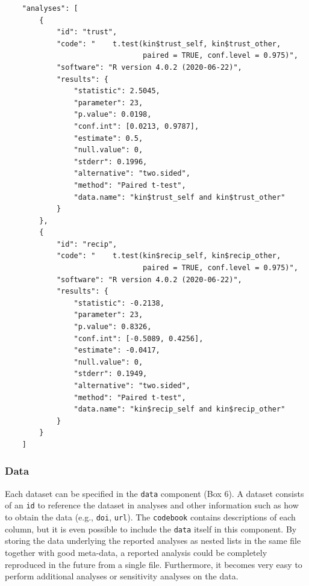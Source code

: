 \documentclass[
  english,
  doc,floatsintext]{apa6}
\begin{document}
\begin{tcolorbox}[colback=black!5!white,colframe=white!5!black,title=Box 5. The analysis component.]
\begin{verbatim}
    "analyses": [
        {
            "id": "trust",
            "code": "    t.test(kin$trust_self, kin$trust_other, 
                                paired = TRUE, conf.level = 0.975)",
            "software": "R version 4.0.2 (2020-06-22)",
            "results": {
                "statistic": 2.5045,
                "parameter": 23,
                "p.value": 0.0198,
                "conf.int": [0.0213, 0.9787],
                "estimate": 0.5,
                "null.value": 0,
                "stderr": 0.1996,
                "alternative": "two.sided",
                "method": "Paired t-test",
                "data.name": "kin$trust_self and kin$trust_other"
            }
        },
        {
            "id": "recip",
            "code": "    t.test(kin$recip_self, kin$recip_other, 
                                paired = TRUE, conf.level = 0.975)",
            "software": "R version 4.0.2 (2020-06-22)",
            "results": {
                "statistic": -0.2138,
                "parameter": 23,
                "p.value": 0.8326,
                "conf.int": [-0.5089, 0.4256],
                "estimate": -0.0417,
                "null.value": 0,
                "stderr": 0.1949,
                "alternative": "two.sided",
                "method": "Paired t-test",
                "data.name": "kin$recip_self and kin$recip_other"
            }
        }
    ]
\end{verbatim}
\end{tcolorbox}

\hypertarget{data}{%
\subsubsection{Data}\label{data}}

Each dataset can be specified in the \texttt{data} component (Box 6). A dataset consists of an \texttt{id} to reference the dataset in analyses and other information such as how to obtain the data (e.g., \texttt{doi}, \texttt{url}). The \texttt{codebook} contains descriptions of each column, but it is even possible to include the \texttt{data} itself in this component. By storing the data underlying the reported analyses as nested lists in the same file together with good meta-data, a reported analysis could be completely reproduced in the future from a single file. Furthermore, it becomes very easy to perform additional analyses or sensitivity analyses on the data.
\end{document}
